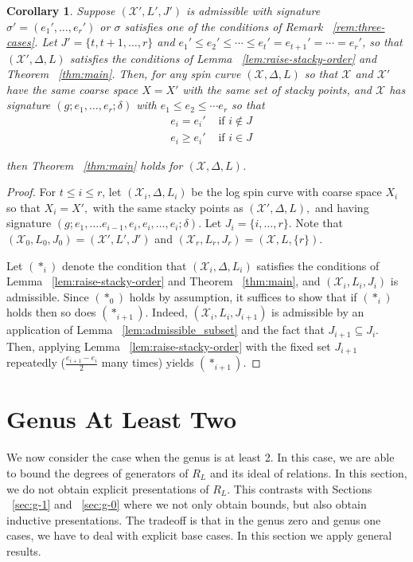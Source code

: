 \documentclass{amsart}
\theoremstyle{plain}
\newtheorem{cor}[thm]{Corollary}
\theoremstyle{definition}
\theoremstyle{remark}
\numberwithin{equation}{section}
\newcommand\sx{\mathscr X}
\newcommand{\halfcan}{L}
\begin{document}
\begin{cor}
\label{cor:raise-stacky-order}
Suppose $(\sx', \halfcan',J')$ is admissible with signature $\sigma' = (e_1
', \ldots,e_r')$ or $\sigma$ satisfies one of the conditions of
Remark ~\ref{rem:three-cases}. Let $J' = \{t,t+1, \ldots,r\}$ and
$e_1' \leq e_2' \leq \cdots \leq e_t' = e_{t+1}' =\cdots = e_r'$,
so that $(\sx', \Delta, L)$ satisfies the conditions of Lemma
~\ref{lem:raise-stacky-order} and Theorem ~\ref{thm:main}. Then,
for any spin curve $(\sx, \Delta, L)$ so that $\sx$ and $\sx'$ have
the same coarse space $X = X'$ with the same set of stacky points,
and $  \sx$ has signature $(g; e_1, \ldots, e_r; \delta)$ with $e_1
\leq e_2 \leq \cdots e_r$ so that
\begin{align*}
	& e_i	= e_i' &\text{ if }i \notin J \\
	& e_i \ge e_i' &\text{ if } i \in J
\end{align*}

\noindent
then Theorem ~\ref{thm:main} holds for $(\sx, \Delta, \halfcan)$.
\end{cor}

\begin{proof}
For $t \leq i \leq r$, let $(\sx_i, \Delta, \halfcan_i)$ be the log spin curve with coarse space $X_i$ so that $X_i = X',$ with the same stacky points as $(\sx', \Delta, \halfcan),$ and having signature $(g; e_1, \ldots. e_{i - 1}, e_i, e_i, \ldots, e_i; \delta).$ Let 
$J_i = \{i, \ldots, r\}.$ Note that $(\sx_0, \halfcan_0,J_0) = (\sx', \halfcan',J')$ and $(\sx_r , \halfcan_r ,J_r) = (\sx, L, \{r\})$.

Let $(*_i)$ denote the condition that $(\sx_i, \Delta, L_i)$
satisfies the conditions of Lemma ~\ref{lem:raise-stacky-order} and
Theorem ~\ref{thm:main}, and $(\sx_i, \halfcan_i, J_i)$ is
admissible. Since $(*_0)$ holds by assumption, it suffices to show
that if $(*_i)$ holds then so does $(*_{i + 1})$. Indeed, $(\sx_i,
\halfcan_i, J_{i + 1})$ is admissible by an application of Lemma
~\ref{lem:admissible_subset} and the fact that $J_{i + 1} \subseteq J
_i$. Then, applying Lemma ~\ref{lem:raise-stacky-order} with the
fixed set $J_{i + 1}$ repeatedly ($\frac{e_{i + 1} - e_i}{2}$ many
times) yields $(*_{i + 1})$.
\end{proof}



\section{Genus At Least Two}
\label{sec:g-high}
We now consider the case when the genus is at least 2. In this case, we are able to bound the degrees of generators of $R_\halfcan$ and its ideal of relations. In this section, we do not obtain explicit presentations of $R_\halfcan$. This contrasts with Sections ~\ref{sec:g-1} and ~\ref{sec:g-0} where we not only obtain bounds, but also obtain inductive presentations. The tradeoff is that in the genus zero and genus one cases, we have to deal with explicit base cases. In this section we apply general results.
\end{document}
